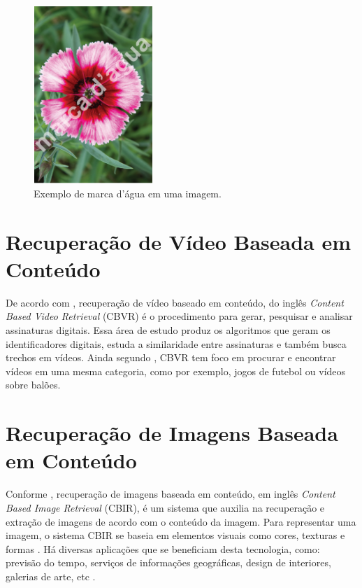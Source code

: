    	\begin{figure}[h]
        \centering
        \includegraphics[width=0.4\textwidth]{dados/figuras/marca_dagua.png}
        \caption{Exemplo de marca d'água em uma imagem.}
    	\label{fig:marcadagua}
    \end{figure}

\section{Recuperação de Vídeo Baseada em Conteúdo}
De acordo com \citeauthor{law2007video}, recuperação de vídeo baseado em conteúdo, do inglês \textit{Content Based Video Retrieval} (CBVR) é o procedimento para gerar, pesquisar e analisar assinaturas digitais. Essa área de estudo produz os algoritmos que geram os identificadores digitais, estuda a similaridade entre assinaturas e também busca trechos em vídeos. Ainda segundo \citeauthor{law2007video}, CBVR tem foco em procurar e encontrar vídeos em uma mesma categoria, como por exemplo, jogos de futebol ou vídeos sobre balões.

\section{Recuperação de Imagens Baseada em Conteúdo}
Conforme \citeauthor{gudivada1995content}, recuperação de imagens baseada em conteúdo, em inglês \textit{Content Based Image Retrieval} (CBIR), é um sistema que auxilia na recuperação e extração de imagens de acordo com o conteúdo da imagem. Para representar uma imagem, o sistema CBIR se baseia em elementos visuais como cores, texturas e formas \citeauthor{vikhar2016improved}. Há diversas aplicações que se beneficiam desta tecnologia, como: previsão do tempo, serviços de informações geográficas, design de interiores, galerias de arte, etc \citeauthor{gudivada1995content}.

